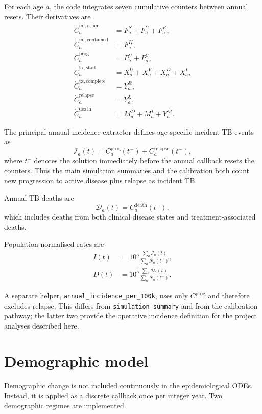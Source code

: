 \documentclass[11pt]{article}
\newcommand{\code}[1]{\texttt{#1}}
\begin{document}
For each age $a$, the code integrates seven cumulative counters between annual resets. Their derivatives are
\begin{align}
\dot C^{\mathrm{inf,other}}_a &=F^S_a+F^C_a+F^R_a,\\
\dot C^{\mathrm{inf,contained}}_a &=F^K_a,\\
\dot C^{\mathrm{prog}}_a &=P^U_a+P^V_a,\\
\dot C^{\mathrm{tx,start}}_a &=X^U_a+X^V_a+X^D_a+X^I_a,\\
\dot C^{\mathrm{tx,complete}}_a &=Y^R_a,\\
\dot C^{\mathrm{relapse}}_a &=Y^L_a,\\
\dot C^{\mathrm{death}}_a &=M^D_a+M^I_a+Y^M_a.
\end{align}

The principal annual incidence extractor defines age-specific incident TB events as
\begin{equation}
\mathcal I_a(t)=C^{\mathrm{prog}}_a(t^-)+C^{\mathrm{relapse}}_a(t^-),
\label{eq:incidence}
\end{equation}
where $t^-$ denotes the solution immediately before the annual callback resets the counters. Thus the main simulation summaries and the calibration both count new progression to active disease plus relapse as incident TB.

Annual TB deaths are
\begin{equation}
\mathcal D_a(t)=C^{\mathrm{death}}_a(t^-),
\end{equation}
which includes deaths from both clinical disease states and treatment-associated deaths.

Population-normalised rates are
\begin{align}
I(t)&=10^5\frac{\sum_a\mathcal I_a(t)}{\sum_aN_a(t^-)},\\
D(t)&=10^5\frac{\sum_a\mathcal D_a(t)}{\sum_aN_a(t^-)}.
\end{align}

A separate helper, \code{annual\_incidence\_per\_100k}, uses only $C^{\mathrm{prog}}$ and therefore excludes relapse. This differs from \code{simulation\_summary} and from the calibration pathway; the latter two provide the operative incidence definition for the project analyses described here.

\section{Demographic model}

Demographic change is not included continuously in the epidemiological ODEs. Instead, it is applied as a discrete callback once per integer year. Two demographic regimes are implemented.
\end{document}
